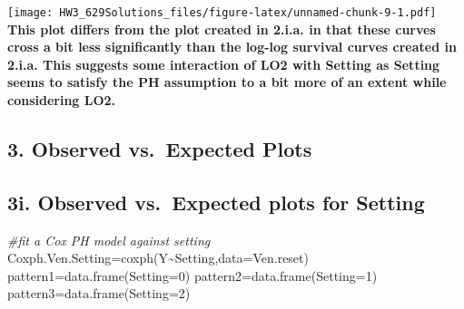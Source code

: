 \documentclass[
]{article}
\newenvironment{Shaded}{\begin{snugshade}}{\end{snugshade}}
\newcommand{\AttributeTok}[1]{\textcolor[rgb]{0.77,0.63,0.00}{#1}}
\newcommand{\CommentTok}[1]{\textcolor[rgb]{0.56,0.35,0.01}{\textit{#1}}}
\newcommand{\DecValTok}[1]{\textcolor[rgb]{0.00,0.00,0.81}{#1}}
\newcommand{\FunctionTok}[1]{\textcolor[rgb]{0.00,0.00,0.00}{#1}}
\newcommand{\NormalTok}[1]{#1}
\newcommand{\OtherTok}[1]{\textcolor[rgb]{0.56,0.35,0.01}{#1}}
\newcommand{\SpecialCharTok}[1]{\textcolor[rgb]{0.00,0.00,0.00}{#1}}
\begin{document}
\texttt{[image: HW3\_629Solutions\_files/figure-latex/unnamed-chunk-9-1.pdf]}
\textbf{This plot differs from the plot created in 2.i.a. in that these
curves cross a bit less significantly than the log-log survival curves
created in 2.i.a. This suggests some interaction of LO2 with Setting as
Setting seems to satisfy the PH assumption to a bit more of an extent
while considering LO2. }

\hypertarget{observed-vs.-expected-plots}{%
\subsection{3. Observed vs.~Expected
Plots}\label{observed-vs.-expected-plots}}

\hypertarget{i.-observed-vs.-expected-plots-for-setting}{%
\subsection{3i. Observed vs.~Expected plots for
Setting}\label{i.-observed-vs.-expected-plots-for-setting}}

\begin{Shaded}
\begin{Highlighting}[]
\CommentTok{\#fit a Cox PH model against setting }
\NormalTok{Coxph.Ven.Setting}\OtherTok{=}\FunctionTok{coxph}\NormalTok{(Y}\SpecialCharTok{\textasciitilde{}}\NormalTok{Setting,}\AttributeTok{data=}\NormalTok{Ven.reset)}
\NormalTok{pattern1}\OtherTok{=}\FunctionTok{data.frame}\NormalTok{(}\AttributeTok{Setting=}\DecValTok{0}\NormalTok{)}
\NormalTok{pattern2}\OtherTok{=}\FunctionTok{data.frame}\NormalTok{(}\AttributeTok{Setting=}\DecValTok{1}\NormalTok{)}
\NormalTok{pattern3}\OtherTok{=}\FunctionTok{data.frame}\NormalTok{(}\AttributeTok{Setting=}\DecValTok{2}\NormalTok{)}
\end{Highlighting}
\end{Shaded}
\end{document}
